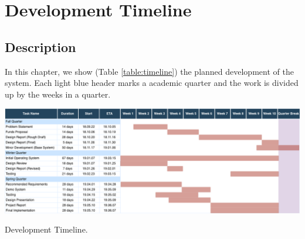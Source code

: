 \chapter{Development Timeline}

\section{Description}
In this chapter, we show (Table \ref{table:timeline}) the planned development of the system. Each light blue header marks a academic quarter and the work is divided up by the weeks in a quarter.

\begin{table}[h]
  \includegraphics[width=\linewidth]{DevelopmentTimeline.png}
  \caption{Development Timeline.}
  \label{table:timeline}
\end{table}
